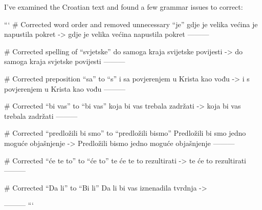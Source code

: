I've examined the Croatian text and found a few grammar issues to correct:

```
# Corrected word order and removed unnecessary “je”
gdje je velika većina je napustila pokret
->
gdje je velika većina napustila pokret
---------

# Corrected spelling of “svjetske”
do samoga kraja svijetske povijesti
->
do samoga kraja svjetske povijesti
---------

# Corrected preposition “sa” to “s”
i sa povjerenjem u Krista kao vođu
->
i s povjerenjem u Krista kao vođu
---------

# Corrected “bi vas” to “bi vas”
koja bi vas trebala zadržati
->
koja bi vas trebala zadržati
---------

# Corrected “predložili bi smo” to “predložili bismo”
Predložili bi smo jedno moguće objašnjenje
->
Predložili bismo jedno moguće objašnjenje
---------

# Corrected “će te to” to “će to”
te će te to rezultirati
->
te će to rezultirati
---------

# Corrected “Da li” to “Bi li”
Da li bi vas iznenadila tvrdnja
->

---------
```